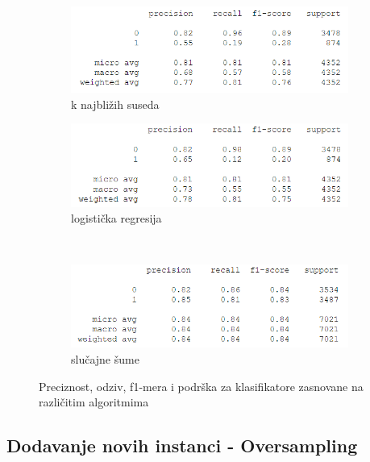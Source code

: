 \documentclass[12pt,oneside]{memoir}
\begin{document}
\begin{figure}[!ht]
    \centering
    \begin{subfigure}[b]{0.45\textwidth}
        \centering
        \includegraphics[width=\textwidth]{knn1}
        \caption{k najbližih suseda}
        \label{fig:kn1}
    \end{subfigure}
    \begin{subfigure}[b]{0.45\textwidth}
        \centering
        \includegraphics[width=\textwidth]{logreg1}
        \caption{logistička regresija}
        \label{fig:logreg1}
    \end{subfigure}
    \\
    \begin{subfigure}[b]{0.45\textwidth}
        \centering
        \includegraphics[width=\textwidth]{randfor1}
        \caption{slučajne šume}
        \label{fig:randfor1}
    \end{subfigure}
    \caption{Preciznost, odziv, f1-mera i podrška za klasifikatore zasnovane na različitim algoritmima}
    \label{fig:dodatno1}
\end{figure}


\subsection{Dodavanje novih instanci - Oversampling} \label{oversampling}
\end{document}
